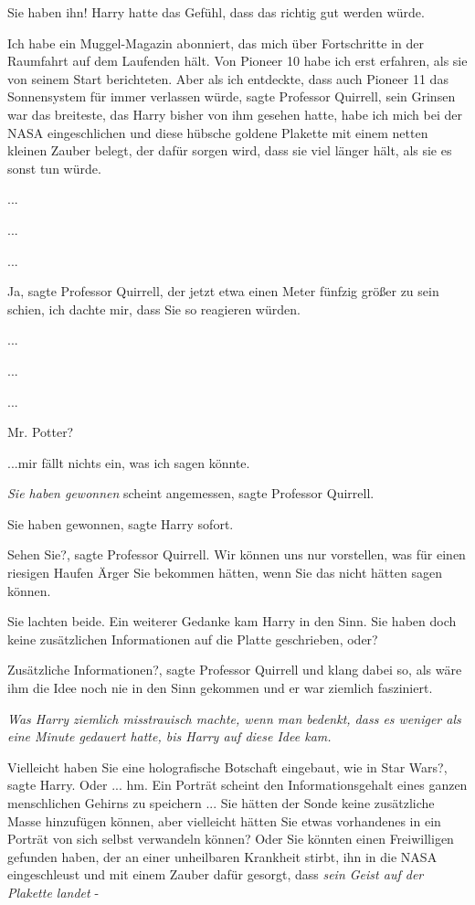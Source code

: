 \glqq{}Sie haben ihn!\grqq{} Harry hatte das Gefühl, dass das richtig gut werden
würde.

\glqq{}Ich habe ein Muggel-Magazin abonniert, das mich über Fortschritte in der
Raumfahrt auf dem Laufenden hält. Von Pioneer 10 habe ich erst erfahren, als sie
von seinem Start berichteten. Aber als ich entdeckte, dass auch Pioneer 11 das
Sonnensystem für immer verlassen würde\grqq{}, sagte Professor Quirrell, sein
Grinsen war das breiteste, das Harry bisher von ihm gesehen hatte, \glqq{}habe
ich mich bei der NASA eingeschlichen und diese hübsche goldene Plakette mit
einem netten kleinen Zauber belegt, der dafür sorgen wird, dass sie viel länger
hält, als sie es sonst tun würde.\grqq{}

...

...

...

\glqq{}Ja\grqq{}, sagte Professor Quirrell, der jetzt etwa einen Meter fünfzig
größer zu sein schien, \glqq{}ich dachte mir, dass Sie so reagieren
würden.\grqq{}

...

...

...

\glqq{}Mr. Potter?\grqq{}

\glqq{}...mir fällt nichts ein, was ich sagen könnte.\grqq{}

\glqq{}\emph{Sie haben gewonnen} scheint angemessen\grqq{}, sagte Professor
Quirrell.

\glqq{}Sie haben gewonnen\grqq{}, sagte Harry sofort.

\glqq{}Sehen Sie?\grqq{}, sagte Professor Quirrell. \glqq{}Wir können uns nur
vorstellen, was für einen riesigen Haufen Ärger Sie bekommen hätten, wenn Sie
das nicht hätten sagen können.\grqq{}

Sie lachten beide. Ein weiterer Gedanke kam Harry in den Sinn. \glqq{}Sie haben
doch keine zusätzlichen Informationen auf die Platte geschrieben, oder?\grqq{}

\glqq{}Zusätzliche Informationen?\grqq{}, sagte Professor Quirrell und klang
dabei so, als wäre ihm die Idee noch nie in den Sinn gekommen und er war
ziemlich fasziniert.

\emph{Was Harry ziemlich misstrauisch machte, wenn man bedenkt, dass es weniger
als eine Minute gedauert hatte, bis Harry auf diese Idee kam.}

\glqq{}Vielleicht haben Sie eine holografische Botschaft eingebaut, wie in Star
Wars?\grqq{}, sagte Harry. \glqq{}Oder ... hm. Ein Porträt scheint den
Informationsgehalt eines ganzen menschlichen Gehirns zu speichern ... Sie hätten
der Sonde keine zusätzliche Masse hinzufügen können, aber vielleicht hätten Sie
etwas vorhandenes in ein Porträt von sich selbst verwandeln können? Oder Sie
könnten einen Freiwilligen gefunden haben, der an einer unheilbaren Krankheit
stirbt, ihn in die NASA eingeschleust und mit einem Zauber dafür gesorgt, dass
\emph{sein Geist auf der Plakette landet} -\grqq{}

